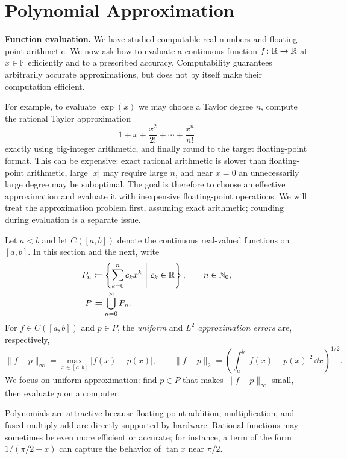 \section{Polynomial Approximation}

\noindent\textbf{Function evaluation.}
We have studied computable real numbers and floating-point arithmetic.
We now ask how to evaluate a continuous function
$f\colon\mathbb{R}\to\mathbb{R}$ at $x\in\mathbb F$ efficiently and to a prescribed
accuracy. Computability guarantees arbitrarily accurate approximations,
but does not by itself make their computation efficient.

For example, to evaluate $\exp(x)$ we may choose a Taylor degree $n$,
compute the rational Taylor approximation
\[
 1+x+\frac{x^2}{2!}+\cdots+\frac{x^n}{n!}
\]
exactly using big-integer arithmetic, and finally round to the target
floating-point format. This can be expensive: exact rational
arithmetic is slower than floating-point arithmetic, large $|x|$
may require large $n$, and near $x=0$ an unnecessarily large degree
may be suboptimal. The goal is therefore to choose an effective
approximation and evaluate it with inexpensive floating-point
operations. We will treat the approximation problem first,
assuming exact arithmetic; rounding during evaluation is a
separate issue.

\begin{definition}
Let $a<b$ and let $C([a, b])$ denote the continuous real-valued
functions on $[a, b]$. In this section and the next, write
\[
 \begin{aligned}
 P_n&\coloneqq\left\{\sum_{k=0}^n c_kx^k\ \middle|\ c_k\in\mathbb{R}\right\},
       \qquad n\in\mathbb{N}_0, \\
 P&\coloneqq\bigcup_{n=0}^{\infty}P_n.
 \end{aligned}
\]
For $f\in C([a, b])$ and $p\in P$, the \emph{uniform} and
\emph{$L^2$ approximation errors} are, respectively,
\[
 \|f-p\|_\infty
 =\max_{x\in[a, b]}|f(x)-p(x)|,
 \qquad
 \|f-p\|_2
 =\left(\int_a^b|f(x)-p(x)|^2\,\dd x\right)^{1/2}.
\]
We focus on uniform approximation: find $p\in P$ that makes
$\|f-p\|_\infty$ small, then evaluate $p$ on a computer.
\end{definition}

Polynomials are attractive because floating-point addition,
multiplication, and fused multiply-add are directly supported by
hardware. Rational functions may sometimes be even more efficient or
accurate; for instance, a term of the form
$1/(\pi/2-x)$ can capture the behavior of $\tan x$ near $\pi/2$.

